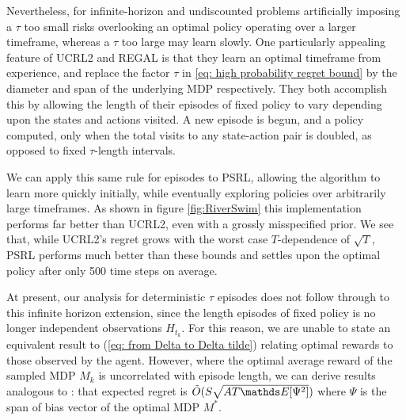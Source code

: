 Nevertheless, for infinite-horizon and undiscounted problems artificially imposing a $\tau$ too small risks overlooking an optimal policy operating over a larger timeframe, whereas a $\tau$ too large may learn slowly. One particularly appealing feature of UCRL2 \cite{jaksch2010near} and REGAL \cite{bartlett2009regal}  is that they learn an optimal timeframe from experience, and replace the factor $\tau$ in \eqref{eq: high probability regret bound} by the diameter and span of the underlying MDP respectively. They both accomplish this by allowing the length of their episodes of fixed policy to vary depending upon the states and actions visited. A new episode is begun, and a policy computed, only when the total visits to any state-action pair is doubled, as opposed to fixed $\tau$-length intervals.

We can apply this same rule for episodes to PSRL, allowing the algorithm to learn more quickly initially, while eventually exploring policies over arbitrarily large timeframes. As shown in figure \ref{fig:RiverSwim} this implementation performs far better than UCRL2, even with a grossly misspecified prior. We see that, while UCRL2's regret grows with the worst case $T$-dependence of $\sqrt{T}$, PSRL performs much better than these bounds and settles upon the optimal policy after only 500 time steps on average.

At present, our analysis for deterministic $\tau$ episodes does not follow through to this infinite horizon extension, since the length episodes of fixed policy is no longer independent observations $H_{t_k}$. For this reason, we are unable to state an equivalent result to (\ref{eq: from Delta to Delta tilde}) relating optimal rewards to those observed by the agent. However, where the optimal average reward of the sampled MDP $M_k$ is uncorrelated with episode length, we can derive results analogous to \cite{jaksch2010near,bartlett2009regal}: that expected regret is $\tilde{O}(S \sqrt{AT \Exp[\Psi^2]})$ where $\Psi$ is the span of bias vector of the optimal MDP $M^*$.


